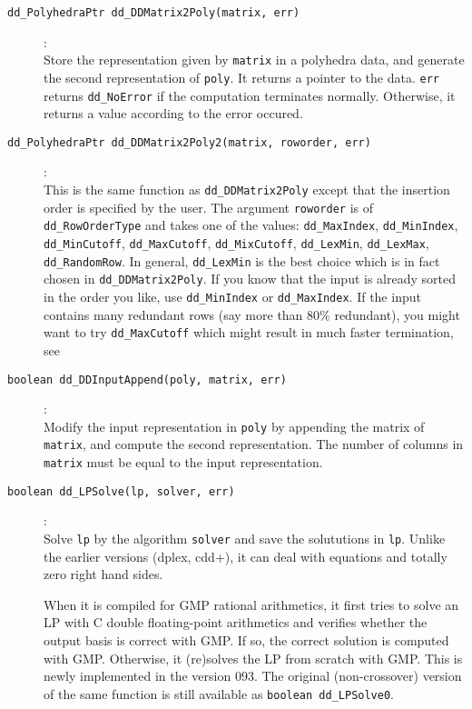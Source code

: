 \documentclass[11pt]{article}
\newcommand {\0} {{\bf 0}}
\begin{document}
\begin{description}
\item[{\tt dd\_PolyhedraPtr dd\_DDMatrix2Poly(matrix, err)}]:\\
Store the representation given by {\tt matrix} in a polyhedra data, and
generate the second representation of {\tt *poly}.  It returns
a pointer to the data. {\tt *err}
returns {\tt dd\_NoError} if the computation terminates normally.  Otherwise,
it returns a value according to the error occured.

\item[{\tt dd\_PolyhedraPtr dd\_DDMatrix2Poly2(matrix, roworder, err)}]:\\
This is the same function as  {\tt dd\_DDMatrix2Poly} except that the insertion
order is specified by the user.  The argument {\tt roworder} is of {\tt dd\_RowOrderType}
and takes one of the values:
  {\tt dd\_MaxIndex}, {\tt dd\_MinIndex}, {\tt dd\_MinCutoff}, {\tt dd\_MaxCutoff}, {\tt dd\_MixCutoff},
   {\tt dd\_LexMin}, {\tt dd\_LexMax}, {\tt dd\_RandomRow}.   In general, {\tt dd\_LexMin} is
the best choice which is in fact chosen in {\tt dd\_DDMatrix2Poly}.  If you know that 
the input is already sorted in the order you like, use  {\tt dd\_MinIndex} or  {\tt dd\_MaxIndex}.
If the input contains many redundant rows (say more than $80\%$ redundant),
you might want to try {\tt dd\_MaxCutoff} which might result in much faster termination,
see \cite{abs-hgach-97,fp-ddmr-96}

\item[{\tt boolean dd\_DDInputAppend(poly, matrix, err)}]:\\
Modify the input representation in {\tt *poly}
by appending the matrix of {\tt *matrix}, and compute
the second representation.  The number of columns in
{\tt *matrix} must be equal to the input representation.

\item[{\tt boolean dd\_LPSolve(lp, solver, err)}]:\\
Solve {\tt lp} by the algorithm {\tt solver} and save
the solututions in {\tt *lp}.  Unlike the earlier versions
(dplex, cdd+), it can deal with equations and totally zero right
hand sides.  

When it is compiled for GMP rational
arithmetics, it first tries to solve an LP with C  double
floating-point arithmetics and verifies whether the output
basis is correct with GMP.  If so, the correct solution is
computed with GMP.  Otherwise, it (re)solves the LP
from scratch with GMP.   This is newly implemented
in the version 093.  The original (non-crossover) version of 
the same function is still  available as {\tt boolean dd\_LPSolve0}.


\end{description}
\end{document}
